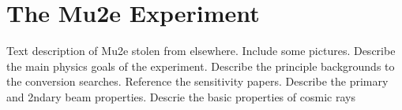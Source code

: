 \section {The Mu2e Experiment}
\label{subsec:mu2e}
Text description of Mu2e stolen from elsewhere.  Include some pictures.
Describe the main physics goals of the experiment.
Describe the principle backgrounds to the conversion searches.  Reference the sensitivity papers.
Describe the primary and 2ndary beam properties.
Descrie the basic properties of cosmic rays

